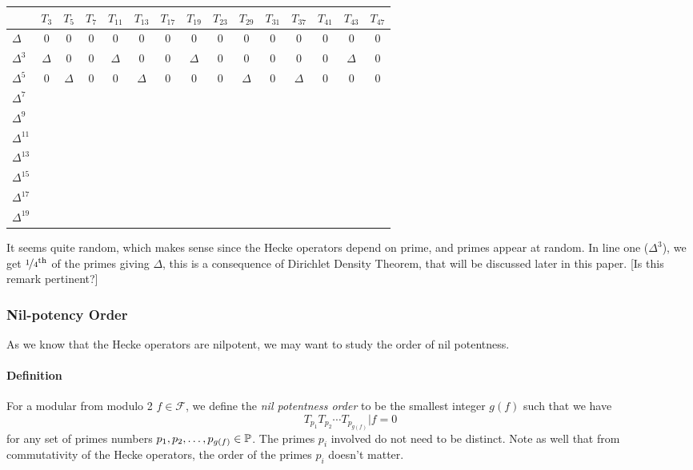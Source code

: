 \begin{center}
	\begin{tabular}{l|c c c c c c c c c c c c c c}
		 & $T_3$ & $T_5$ & $T_7$ & $T_{11}$ & $T_{13}$
		 & $T_{17}$ & $T_{19}$ & $T_{23}$ & $T_{29}$ & $T_{31}$ 
		 & $T_{37}$ & $T_{41}$ & $T_{43}$ & $T_{47}$ \\
		\hline
		$\Delta$ & 0 & 0 & 0 & 0 & 0 & 0 & 0 & 0 & 0 & 0 & 0 & 0 & 0 & 0\\
		$\Delta^3$ & $\Delta$ & 0 & 0 & $\Delta$ & 0 & 0 & $\Delta$ & 0 & 0 & 0 & 0 & 0 & $\Delta$ & 0\\
		$\Delta^5$ & 0 & $\Delta$ & 0 & 0 & $\Delta$ & 0 & 0 & 0 & $\Delta$ & 0 & $\Delta$ & 0 & 0 & 0\\
		$\Delta^7$ &  &  &  &  &  &  &  &  &  &  &  &  &  & \\
		$\Delta^9$ &  &  &  &  &  &  &  &  &  &  &  &  &  & \\
		$\Delta^{11}$ &  &  &  &  &  &  &  &  &  &  &  &  &  & \\
		$\Delta^{13}$ &  &  &  &  &  &  &  &  &  &  &  &  &  & \\
		$\Delta^{15}$ &  &  &  &  &  &  &  &  &  &  &  &  &  & \\
		$\Delta^{17}$ &  &  &  &  &  &  &  &  &  &  &  &  &  & \\
		$\Delta^{19}$ &  &  &  &  &  &  &  &  &  &  &  &  &  & \\
	\end{tabular}
\end{center}

It seems quite random, which makes sense since the Hecke operators depend on prime, and primes appear at random.
In line one ($\Delta^3$), we get $\nicefrac{1}{4}^{\text{th}}$ of the primes giving $\Delta$, this is a consequence of Dirichlet Density Theorem, that will be discussed later in this paper.
[Is this remark pertinent?]

\subsubsection{Nil-potency Order}
As we know that the Hecke operators are nilpotent, we may want to study the order of nil potentness.
\paragraph{Definition}
For a modular from modulo 2 $f \in \mathcal{F}$, we define the \textit{nil potentness order} to be the smallest integer $g(f)$ such that we have 
$$
T_{p_1} T_{p_2} \cdots T_{p_{g(f)}} | f = 0
$$
for any set of primes numbers $p_1, p_2, \dots, p_{g(f)} \in \mathbb{P}$.
The primes $p_i$ involved do not need to be distinct.
Note as well that from commutativity of the Hecke operators, the order of the primes $p_i$ doesn't matter.

